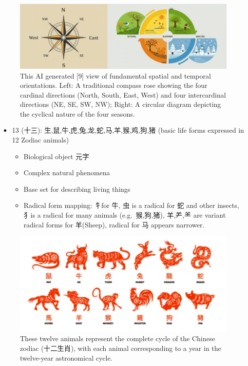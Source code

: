 \begin{figure}
\centering
\includegraphics{./images/8-directions-seasons.png}
\caption{This AI generated {[}9{]} view of fundamental spatial and
temporal orientations. Left: A traditional compass rose showing the four
cardinal directions (North, South, East, West) and four intercardinal
directions (NE, SE, SW, NW); Right: A circular diagram depicting the
cyclical nature of the four seasons.}
\end{figure}

\begin{itemize}
\tightlist
\item
  13 (十三): 生,鼠,牛,虎,兔,龙,蛇,马,羊,猴,鸡,狗,猪 (basic life forms
  expressed in 12 Zodiac animals)

  \begin{itemize}
  \tightlist
  \item
    Biological object 元字
  \item
    Complex natural phenomena
  \item
    Base set for describing living things
  \item
    Radical form mapping: 牜for 牛, 虫 is a radical for 蛇 and other
    insects, 犭is a radical for many animals (e.g.~猴,狗,猪), 羊,⺶,⺷
    are variant radical forms for 羊(Sheep), radical for 马 appears
    narrower.
  \end{itemize}
\end{itemize}

\begin{figure}
\centering
\includegraphics{./images/12-zodiac-animals.png}
\caption{These twelve animals represent the complete cycle of the
Chinese zodiac (十二生肖), with each animal corresponding to a year in
the twelve-year astronomical cycle.}
\end{figure}

